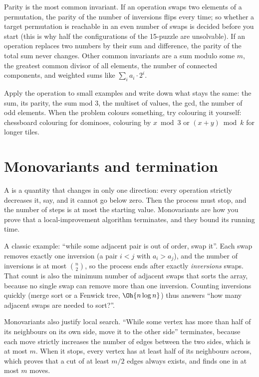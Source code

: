 Parity is the most common invariant. If an operation swaps two elements of a permutation, the parity of the number of
inversions flips every time; so whether a target permutation is reachable in an even number of swaps is decided before you
start (this is why half the configurations of the 15-puzzle are unsolvable). If an operation replaces two numbers by their
sum and difference, the parity of the total sum never changes. Other common invariants are a sum modulo some $m$, the
greatest common divisor of all elements, the number of connected components, and weighted sums like $\sum_i a_i \cdot 2^i$.

\begin{tip}
Apply the operation to small examples and write down what stays the same: the sum, its parity, the sum mod 3, the
multiset of values, the gcd, the number of odd elements. When the problem colours something, try colouring it yourself:
chessboard colouring for dominoes, colouring by $x \bmod 3$ or $(x + y) \bmod k$ for longer tiles.
\end{tip}

\section[Monovariants and termination]{Monovariants and termination \hfill \gold}\label{sec:monovariant}

A  is a quantity that changes in only one direction: every operation strictly decreases it, say, and it
cannot go below zero. Then the process must stop, and the number of steps is at most the starting value. Monovariants are
how you prove that a local-improvement algorithm terminates, and they bound its running time.

A classic example: ``while some adjacent pair is out of order, swap it''. Each swap removes exactly one inversion (a pair
$i < j$ with $a_i > a_j$), and the number of inversions is at most $\binom n2$, so the process ends after exactly
\emph{inversions} swaps. That count is also the minimum number of adjacent swaps that sorts the array, because no single
swap can remove more than one inversion. Counting inversions quickly (merge sort or a Fenwick tree, $\Oh{n\log n}$) thus
answers ``how many adjacent swaps are needed to sort?''.

Monovariants also justify local search. ``While some vertex has more than half of its neighbours on its own side, move it
to the other side'' terminates, because each move strictly increases the number of edges between the two sides, which is at
most $m$. When it stops, every vertex has at least half of its neighbours across, which proves that a cut of at least $m/2$
edges always exists, and finds one in at most $m$ moves.

